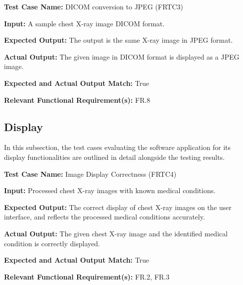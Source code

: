 \documentclass[12pt, titlepage]{article}
\begin{document}

\begin{mdframed}[linewidth=0.5mm]
  \textbf{Test Case Name:} DICOM conversion to JPEG (FRTC3) \par
  \textbf{Input:} A sample chest X-ray image DICOM format. \par
  \textbf{Expected Output:} The output is the same X-ray image in JPEG format. \par
  \textbf{Actual Output:} The given image in DICOM format is displayed as a JPEG image. \par
  \textbf{Expected and Actual Output Match:} True \par
  \textbf{Relevant Functional Requirement(s):} FR.8
\end{mdframed}

\subsection{Display}
In this subsection, the test cases evaluating the software application for its display functionalities are outlined in detail alongside the testing results. \\

\begin{mdframed}[linewidth=0.5mm]
  \textbf{Test Case Name:} Image Display Correctness (FRTC4) \par
  \textbf{Input:} Processed chest X-ray images with known medical conditions. \par
  \textbf{Expected Output:} The correct display of chest X-ray images on the user interface, and reflects the processed medical conditions accurately. \par
  \textbf{Actual Output:} The given chest X-ray image and the identified medical condition is correctly displayed. \par
  \textbf{Expected and Actual Output Match:} True \par
  \textbf{Relevant Functional Requirement(s):} FR.2, FR.3
\end{mdframed}
\end{document}

